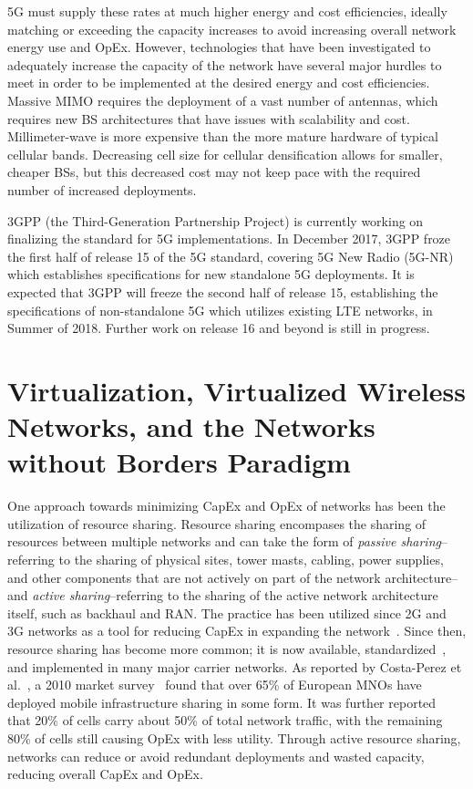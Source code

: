 \documentclass[12pt,dvipsnames]{report}
\begin{document}
5G must supply these rates at much higher energy and cost efficiencies, ideally matching or exceeding the capacity increases to avoid increasing overall network energy use and OpEx.  However, technologies that have been investigated to adequately increase the capacity of the network have several major hurdles to meet in order to be implemented at the desired energy and cost efficiencies.  Massive MIMO requires the deployment of a vast number of antennas, which requires new BS architectures that have issues with scalability and cost.  Millimeter-wave is more expensive than the more mature hardware of typical cellular bands.  Decreasing cell size for cellular densification allows for smaller, cheaper BSs, but this decreased cost may not keep pace with the required number of increased deployments.~\cite{6824752}

3GPP (the Third-Generation Partnership Project) is currently working on finalizing the standard for 5G implementations.  In December 2017, 3GPP froze the first half of release 15 of the 5G standard, covering 5G New Radio (5G-NR) which establishes specifications for new standalone 5G deployments.  It is expected that 3GPP will freeze the second half of release 15, establishing the specifications of non-standalone 5G which utilizes existing LTE networks, in Summer of 2018.  Further work on release 16 and beyond is still in progress.

\section{Virtualization, Virtualized Wireless Networks, and the Networks without Borders Paradigm} \label{sec:virtualization}

One approach towards minimizing CapEx and OpEx of networks has been the utilization of resource sharing.  Resource sharing encompases the sharing of resources between multiple networks and can take the form of \emph{passive sharing}--referring to the sharing of physical sites, tower masts, cabling, power supplies, and other components that are not actively on part of the network architecture--and \emph{active sharing}--referring to the sharing of the active network architecture itself, such as backhaul and RAN.  The practice has been utilized since 2G and 3G networks as a tool for reducing CapEx in expanding the network~\cite{1421931}.  Since then, resource sharing has become more common; it is now available, standardized~\cite{3GPP_TS_23.251}, and implemented in many major carrier networks.  As reported by Costa-Perez et al.~\cite{6553675}, a 2010 market survey~\cite{NetSharingReport} found that over 65\% of European MNOs have deployed mobile infrastructure sharing in some form.  It was further reported~\cite{6553675} that 20\% of cells carry about 50\% of total network traffic, with the remaining 80\% of cells still causing OpEx with less utility.  Through active resource sharing, networks can reduce or avoid redundant deployments and wasted capacity, reducing overall CapEx and OpEx.
\end{document}

